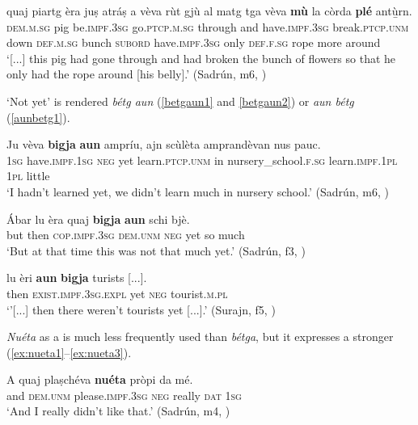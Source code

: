 \ea
\label{ex:muple2}
\gll    [...] quaj piartg èra juṣ atráṣ a vèva rùt gjù al matg tga vèva \textbf{mù} la còrda \textbf{plé} antù̱rn.\\
{} \textsc{dem.m.sg} pig be.\textsc{impf.3sg} go.\textsc{ptcp.m.sg} through and have.\textsc{impf.3sg} break.\textsc{ptcp.unm} down \textsc{def.m.sg} bunch  \textsc{subord} have.\textsc{impf.3sg} only \textsc{def.f.sg} rope more around\\
\glt `[...] this pig had gone through and had broken the bunch of flowers so that he only had the rope around [his belly].' (Sadrún, m6, )
\z

`Not yet' is rendered \textit{bétg aun} (\ref{betgaun1} and \ref{betgaun2}) or \textit{aun bétg} (\ref{aunbetg1}).

\ea
\label{betgaun1}
\gll  Ju vèva \textbf{bigja} \textbf{aun} ampríu, ajn scùlèta amprandèvan nus pauc.\\
\textsc{1sg} have.\textsc{impf.1sg} \textsc{neg} yet  learn.\textsc{ptcp.unm} in  nursery\_school.\textsc{f.sg} learn.\textsc{impf.1pl}  \textsc{1pl} little \\
\glt `I hadn’t learned yet, we didn’t learn much in nursery school.' (Sadrún, m6, )
\z

\ea
\label{betgaun2}
\gll  Ábar lu èra quaj \textbf{bigja} \textbf{aun} schi bjè.  \\
but then \textsc{cop.impf.3sg} \textsc{dem.unm} \textsc{neg} yet so much  \\
\glt `But at that time this was not that much yet.' (Sadrún, f3, )
\z

\ea
\label{aunbetg1}
\gll    [...] lu èri \textbf{aun} \textbf{bigja} turists [...]. \\
{} then \textsc{exist.impf.3sg.expl} yet \textsc{neg} tourist.\textsc{m.pl}\\
\glt `'[...]  then there weren’t tourists yet [...].' (Surajn, f5, )
\z


\textit{Nuéta} as a  is much less frequently used than \textit{bétga}, but it expresses a stronger  (\ref{ex:nueta1}--\ref{ex:nueta3}).

\ea
\label{ex:nueta1}
\gll A quaj plaṣchéva \textbf{nuéta} pròpi da mé. \\
and \textsc{dem.unm} please.\textsc{impf.3sg} \textsc{neg} really \textsc{dat} \textsc{1sg}\\
\glt `And I really didn’t  like that.' (Sadrún, m4, )
\z

